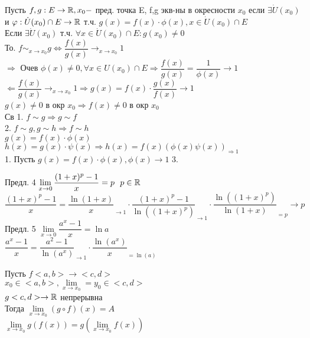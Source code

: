 Пусть $ f, g : E \rightarrow \mathbb{R}, x_0 - $ пред. точка E, f,g экв-ны в окресности $ x_0 $ если $ \exists \dot{U}(x_0) $ и $ \varphi : \dot{U} (x_0) \cap E \rightarrow \mathbb{R} $ т.ч. $ g(x) = f(x) \cdot \phi(x), x\in \dot{U} (x_0) \cap E $ \\
Если $ \exists \dot{U}(x_0) $ т.ч. $ \forall x \in \dot{U} (x_0) \cap E : g(x_0) \neq 0 $\\
То. $ f \sim_{x \rightarrow x_0} g \Leftrightarrow \dfrac{ f(x)}{g(x)} \rightarrow_{x \rightarrow x_0} 1 $ \\
 $ \Rightarrow $ Очев $ \phi (x) \neq 0, \forall x \in U(x_0) \cap E \Rightarrow \dfrac{f(x)}{g(x)} = \dfrac{1}{\phi (x)} \rightarrow 1 $ \\
$ \Leftarrow \dfrac{f(x)}{g(x)} \rightarrow_{x \rightarrow x_0} 1\Rightarrow g(x) = f(x) \cdot \dfrac{g(x)}{f(x)} \rightarrow 1 $ \\
$ g(x) \neq 0 $ в окр $ x_0 \Rightarrow f(x) \neq 0 $ в окр $ x_0 $\\
Св 1. $ f \sim g \Rightarrow g \sim f $ \\
2. $ f \sim g , g \sim h \Rightarrow f \sim h $\\
$ g(x) = f(x) \cdot \phi(x) $
$ h(x) = g(x) \cdot \psi(x) \Rightarrow h(x) = f(x) (\phi(x)\psi(x))_{\Rightarrow 1} $\\
1. Пусть $ g(x) = f(x) \cdot \phi(x), \phi(x) \rightarrow 1$%
3. 


Предл. 4 $ \lim\limits_{x \rightarrow 0} \dfrac{(1+x)^p-1}{x} = p \ \ p \in \mathbb{R} $ \\
$   \dfrac{(1+x)^p-1}{x} = \dfrac{\ln(1+x)}{x}_{\rightarrow 1} \cdot \dfrac{(1+x)^p - 1}{\ln((1+x)^p)}_{\rightarrow 1} \cdot \dfrac{\ln((1+x)^p)}{\ln(1+x)}_{=p} \rightarrow p$ \\
Предл. 5 $ \lim\limits_{x \rightarrow 0} \dfrac{a^x-1}{x} = \ln a $ \\
$ \dfrac{a^x-1}{x} = \dfrac{a^2 - 1}{\ln(a^x)}_{\rightarrow 1} \cdot \dfrac{\ln(a^x)}{x}_{=\ln(a)} $
\begin{lemma}
	Пусть $ f <a,b> \rightarrow <c,d> $ \\
	$ x_0 \in <a,b>, \lim\limits_{x \rightarrow x_0} = y_0 \in <c,d> $ \\
	$ g <c, d> \rightarrow \mathbb{R} $ непрерывна \\
	Тогда $ \lim\limits_{x \rightarrow x_0} (g \circ f)(x) = A $ \\
	$ \lim\limits_{x \rightarrow x_0} g(f(x)) = g(\lim\limits_{x \rightarrow x_0} f(x)) $ 
\end{lemma}

